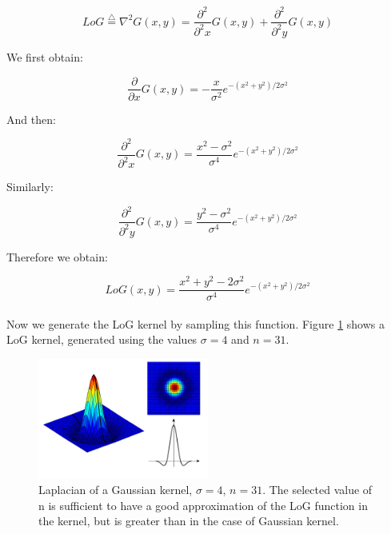 \documentclass{ipol}
\numberwithin{equation}{section}
\numberwithin{table}{section}
\numberwithin{figure}{section}
\begin{document}
\begin{equation}
	LoG \stackrel{\triangle}{=}\nabla^2G(x,y)=\frac{\partial^2}{\partial^2 x}G(x,y) + \frac{\partial^2}{\partial^2 y}G(x,y)
\end{equation}

We first obtain:

\begin{equation} 
	\frac{\partial}{\partial x}G(x,y)=-\frac{x}{\sigma^2}e^{-(x^2+y^2)/2\sigma^2}
\end{equation}

And then:

\begin{equation} 
	\frac{\partial^2}{\partial^2 x}G(x,y)=\frac{x^2-\sigma^2}{\sigma^4}e^{-(x^2+y^2)/2\sigma^2} 
\end{equation}

Similarly:

\begin{equation} 
	\frac{\partial^2}{\partial^2 y}G(x,y)=\frac{y^2-\sigma^2}{\sigma^4}e^{-(x^2+y^2)/2\sigma^2} 
\end{equation}

Therefore we obtain:

\begin{equation}
	\label{eq:log_function}
	LoG(x,y)=\frac{x^2+y^2-2\sigma^2}{\sigma^4}e^{-(x^2+y^2)/2\sigma^2}
\end{equation}\\

Now we generate the LoG kernel by sampling this function. Figure \ref{fig:log_kernel} shows a LoG kernel, generated using the 
values $\sigma=4$ and $n=31$.\\

\begin{figure}
	\centering
	\includegraphics[width=0.5\textwidth]{kernel_log.pdf}
	\caption{Laplacian of a Gaussian kernel, $\sigma=4$, $n=31$. The selected value of n is sufficient 
to have a good approximation of the LoG function in the kernel, but is greater than in the case of 
Gaussian kernel.}
	\label{fig:log_kernel}
\end{figure}
\end{document}
